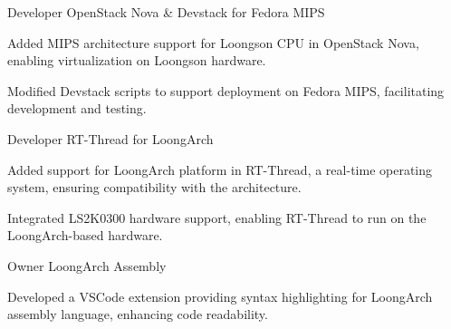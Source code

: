 \begin{cventries}
\cventry
{Developer} %
{OpenStack Nova \& Devstack for Fedora MIPS} %
{} %
{} %
{
  \begin{cvitems} %
    \item {Added MIPS architecture support for Loongson CPU in OpenStack Nova, enabling virtualization on Loongson hardware.}
    \item {Modified Devstack scripts to support deployment on Fedora MIPS, facilitating development and testing.}
  \end{cvitems}
}

\cventry
{Developer} %
{RT-Thread for LoongArch} %
{} %
{} %
{
  \begin{cvitems} %
    \item {Added support for LoongArch platform in RT-Thread, a real-time operating system, ensuring compatibility with the architecture.}
    \item {Integrated LS2K0300 hardware support, enabling RT-Thread to run on the LoongArch-based hardware.}
  \end{cvitems}
}

\cventry
{Owner} %
{LoongArch Assembly} %
{} %
{} %
{
  \begin{cvitems} %
    \item {Developed a VSCode extension providing syntax highlighting for LoongArch assembly language, enhancing code readability.}
  \end{cvitems}
}

\end{cventries}
